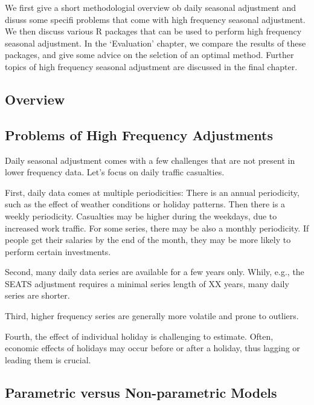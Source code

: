 We first give a short methodologial overview ob daily seasonal
adjustment and disuss some specifi problems that come with high
frequency seasonal adjustment. We then discuss various R packages that
can be used to perform high frequency seasonal adjustment. In the
`Evaluation' chapter, we compare the results of these packages, and give
some advice on the selction of an optimal method. Further topics of high
frequency seasonal adjustment are discussed in the final chapter.

\hypertarget{overview}{%
\subsection{Overview}\label{overview}}

\hypertarget{problems-of-high-frequency-adjustments}{%
\subsection{Problems of High Frequency
Adjustments}\label{problems-of-high-frequency-adjustments}}

Daily seasonal adjustment comes with a few challenges that are not
present in lower frequency data. Let's focus on daily traffic
casualties.

First, daily data comes at multiple periodicities: There is an annual
periodicity, such as the effect of weather conditions or holiday
patterns. Then there is a weekly periodicity. Casualties may be higher
during the weekdays, due to increased work traffic. For some series,
there may be also a monthly periodicity. If people get their salaries by
the end of the month, they may be more likely to perform certain
investments.

Second, many daily data series are available for a few years only.
Whily, e.g., the SEATS adjustment requires a minimal series length of XX
years, many daily series are shorter.

Third, higher frequency series are generally more volatile and prone to
outliers.

Fourth, the effect of individual holiday is challenging to estimate.
Often, economic effects of holidays may occur before or after a holiday,
thus lagging or leading them is crucial.

\hypertarget{parametric-versus-non-parametric-models}{%
\subsection{Parametric versus Non-parametric
Models}\label{parametric-versus-non-parametric-models}}

